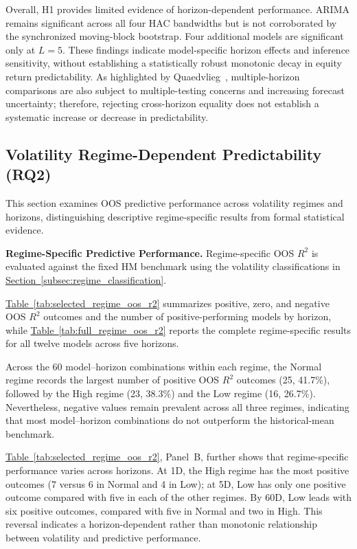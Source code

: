 \documentclass[runningheads,orivec]{llncs}
\makeatletter
\providecommand{\FloatBarrier}{\par\ifx\@deferlist\@empty\else\clearpage\fi}
\makeatother
\begin{document}
Overall, H1 provides limited evidence of horizon-dependent performance. ARIMA remains significant across all four HAC bandwidths but is not corroborated by the synchronized moving-block bootstrap. Four additional models are significant only at $L=5$. These findings indicate model-specific horizon effects and inference sensitivity, without establishing a statistically robust monotonic decay in equity return predictability. As highlighted by Quaedvlieg~\cite{quaedvlieg2021}, multiple-horizon comparisons are also subject to multiple-testing concerns and increasing forecast uncertainty; therefore, rejecting cross-horizon equality does not establish a systematic increase or decrease in predictability.

\FloatBarrier
\subsection{Volatility Regime-Dependent Predictability (RQ2)}\label{subsec:volatility_regimes}

This section examines OOS predictive performance across volatility regimes and horizons, distinguishing descriptive regime-specific results from formal statistical evidence.

\medskip
\noindent\textbf{Regime-Specific Predictive Performance.}
Regime-specific OOS $R^2$ is evaluated against the fixed HM benchmark using the volatility classifications in \hyperref[subsec:regime_classification]{Section~\ref*{subsec:regime_classification}}.

\hyperref[tab:selected_regime_oos_r2]{Table~\ref*{tab:selected_regime_oos_r2}} summarizes positive, zero, and negative OOS $R^2$ outcomes and the number of positive-performing models by horizon, while \hyperref[tab:full_regime_oos_r2]{Table~\ref*{tab:full_regime_oos_r2}} reports the complete regime-specific results for all twelve models across five horizons.

Across the 60 model--horizon combinations within each regime, the Normal regime records the largest number of positive OOS $R^2$ outcomes (25, 41.7\%), followed by the High regime (23, 38.3\%) and the Low regime (16, 26.7\%). Nevertheless, negative values remain prevalent across all three regimes, indicating that most model--horizon combinations do not outperform the historical-mean benchmark.

\hyperref[tab:selected_regime_oos_r2]{Table~\ref*{tab:selected_regime_oos_r2}}, Panel~B, further shows that regime-specific performance varies across horizons. At 1D, the High regime has the most positive outcomes (7 versus 6 in Normal and 4 in Low); at 5D, Low has only one positive outcome compared with five in each of the other regimes. By 60D, Low leads with six positive outcomes, compared with five in Normal and two in High. This reversal indicates a horizon-dependent rather than monotonic relationship between volatility and predictive performance.
\end{document}
